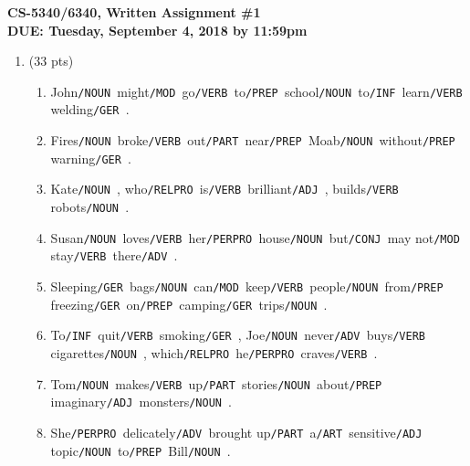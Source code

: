 \documentclass[11pt]{article}
\newcommand{\adj}{\texttt{/ADJ }}
\newcommand{\adv}{\texttt{/ADV }}
\newcommand{\art}{\texttt{/ART }}
\newcommand{\conj}{\texttt{/CONJ }}
\newcommand{\ger}{\texttt{/GER }}
\newcommand{\infi}{\texttt{/INF }}
\newcommand{\mod}{\texttt{/MOD }}
\newcommand{\noun}{\texttt{/NOUN }}
\newcommand{\particle}{\texttt{/PART }}
\newcommand{\prep}{\texttt{/PREP }}
\newcommand{\perpro}{\texttt{/PERPRO }}
\newcommand{\relpro}{\texttt{/RELPRO }}
\newcommand{\ver}{\texttt{/VERB }}
\begin{document}
\large
\begin{center}
{\bf CS-5340/6340, Written Assignment \#1} \\
{\bf DUE: Tuesday, September 4, 2018 by 11:59pm}
\end{center}
\normalsize

\begin{enumerate}  


\item (33 pts) 

\begin{enumerate}

\item John\noun might\mod go\ver to\prep school\noun to\infi learn\ver welding\ger.
\vspace*{.2in}


\item Fires\noun broke\ver out\particle near\prep Moab\noun without\prep warning\ger.
\vspace*{.2in}


\item Kate\noun, who\relpro is\ver brilliant\adj, builds\ver robots\noun. 
\vspace*{.2in}


\item Susan\noun loves\ver her\perpro house\noun but\conj may not\mod stay\ver there\adv.
\vspace*{.2in}


\item Sleeping\ger bags\noun can\mod keep\ver people\noun from\prep freezing\ger on\prep camping\ger trips\noun.
\vspace*{.2in}


\item To\infi quit\ver smoking\ger, Joe\noun never\adv buys\ver cigarettes\noun, which\relpro he\perpro craves\ver.
\vspace*{.2in}


\item  Tom\noun makes\ver up\particle stories\noun about\prep imaginary\adj monsters\noun.
\vspace*{.2in}


\item She\perpro delicately\adv brought up\particle a\art sensitive\adj topic\noun to\prep Bill\noun.
\vspace*{.2in}



\end{enumerate}
\end{enumerate}
\end{document}
